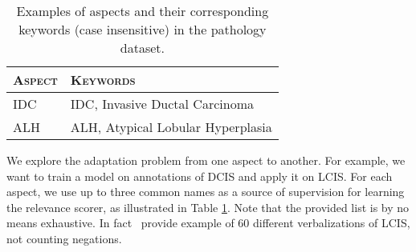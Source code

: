 \begin{table}[t]
    \centering
    \begin{tabular}{ll}
	\toprule
    \textsc{Aspect} & \textsc{Keywords} \\
    \midrule
    IDC & IDC, Invasive Ductal Carcinoma \\
    ALH & ALH, Atypical Lobular Hyperplasia \\
    \bottomrule
    \end{tabular}
    \caption{Examples of aspects and their corresponding keywords (case insensitive) in the pathology dataset.}\label{tb:keywords}
\end{table}


We explore the adaptation problem from one aspect to another. For example, we want to train a model on annotations of DCIS and apply it on LCIS. 
For each aspect, we use up to three 
common names as a source of supervision for learning the relevance scorer, as illustrated in Table \ref{tb:keywords}. Note that the provided list is by no means  exhaustive. In fact~ provide example of 60 different verbalizations of LCIS, not counting negations.

